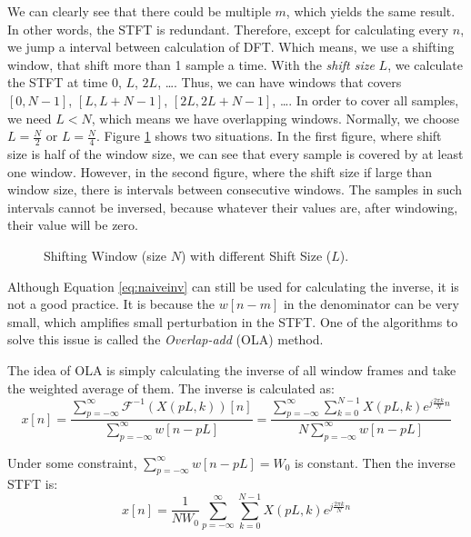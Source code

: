 \documentclass[11pt,a4paper]{report}
\begin{document}
We can clearly see that there could be multiple $m$, which yields the same result. In other words, the STFT is redundant. Therefore, except for calculating every $n$, we jump a interval between calculation of DFT. Which means, we use a shifting window, that shift more than 1 sample a time. With the \textit{shift size} $L$, we calculate the STFT at time $0$, $L$, $2L$, \dots. Thus, we can have windows that covers $[0, N-1]$, $[L, L+N-1]$, $[2L, 2L+N-1]$, \dots. In order to cover all samples, we need $L<N$, which means we have overlapping windows. Normally, we choose $L = \frac{N}{2}$ or $L = \frac{N}{4}$. Figure \ref{fig:window} shows two situations. In the first figure, where shift size is half of the window size, we can see that every sample is covered by at least one window. However, in the second figure, where the shift size if large than window size, there is intervals between consecutive windows. The samples in such intervals cannot be inversed, because whatever their values are, after windowing, their value will be zero. 

\begin{figure}[thbp]
  \centering
  
  \caption{Shifting Window (size $N$) with different Shift Size ($L$).}
  \label{fig:window}
\end{figure}

Although Equation \ref{eq:naiveinv} can still be used for calculating the inverse, it is not a good practice. It is because the $w[n-m]$ in the denominator can be very small, which amplifies small perturbation in the STFT. One of the algorithms to solve this issue is called the \textit{Overlap-add} (OLA) method.

The idea of OLA is simply calculating the inverse of all window frames and take the weighted average of them. The inverse is calculated as:
\begin{equation}
  x[n] = \frac{\sum_{p=-\infty}^{\infty} \mathcal{F}^{-1}(X(pL,k))[n]}{\sum_{p=-\infty}^{\infty} w[n-pL]}
  = \frac{\sum_{p=-\infty}^{\infty} \sum_{k=0}^{N-1} X(pL,k)e^{j \frac{2\pi k}{N} n}}{N\sum_{p=-\infty}^{\infty} w[n-pL]}
\end{equation}

Under some constraint, $\sum_{p=-\infty}^{\infty} w[n-pL] = W_0$ is constant. Then the inverse STFT is:
\begin{equation}
  x[n] = \frac{1}{NW_0} \sum_{p=-\infty}^{\infty} \sum_{k=0}^{N-1} X(pL,k)e^{j \frac{2\pi k}{N} n} 
  \label{eq:olainv}
\end{equation}
\end{document}
